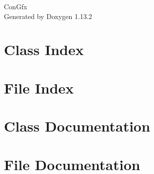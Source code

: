 \documentclass[twoside]{book}
\newcommand{\+}{\discretionary{\mbox{\scriptsize$\hookleftarrow$}}{}{}}
\newcommand{\clearemptydoublepage}{%
    \newpage{\pagestyle{empty}\cleardoublepage}%
  }
\begin{document}
  \raggedbottom
    \hypersetup{pageanchor=false,
                bookmarksnumbered=true,
                pdfencoding=unicode
               }
  \begin{titlepage}
  \vspace*{7cm}
  \begin{center}%
  {\Large Con\+Gfx}\\
  \vspace*{1cm}
  {\large Generated by Doxygen 1.13.2}\\
  \end{center}
  \end{titlepage}
  \clearemptydoublepage
  \tableofcontents
  \clearemptydoublepage
  \hypersetup{pageanchor=true}
\chapter{Class Index}

\chapter{File Index}

\chapter{Class Documentation}



\chapter{File Documentation}


  \backmatter
  \newpage
  \clearemptydoublepage
  \printindex
\end{document}
